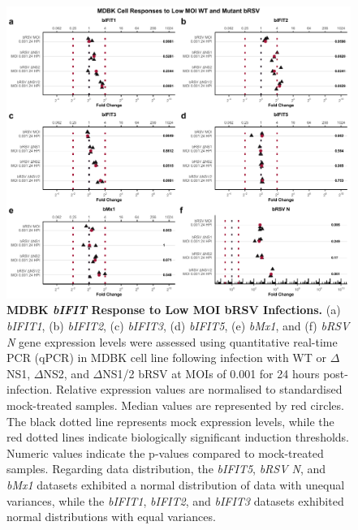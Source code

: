 \begin{figure}
    \centering
    \includegraphics[width=1\linewidth]{07. Chapter 2/Figs/02. Induction/06. mdbk_brsv_low_moi.pdf}
    \caption[MDBK \textit{bIFIT} Response to Low MOI bRSV Infections.]{\textbf{MDBK \textit{bIFIT} Response to Low MOI bRSV Infections.} (a) \textit{bIFIT1}, (b) \textit{bIFIT2}, (c) \textit{bIFIT3}, (d) \textit{bIFIT5}, (e) \textit{bMx1}, and (f) \textit{bRSV N} gene expression levels were assessed using quantitative real-time PCR (qPCR) in MDBK cell line following infection with WT or \(\Delta\)NS1, \(\Delta\)NS2, and \(\Delta\)NS1/2 bRSV at MOIs of 0.001 for 24 hours post-infection. Relative expression values are normalised to standardised mock-treated samples. Median values are represented by red circles. The black dotted line represents mock expression levels, while the red dotted lines indicate biologically significant induction thresholds. Numeric values indicate the p-values compared to mock-treated samples. Regarding data distribution, the \textit{bIFIT5}, \textit{bRSV N}, and \textit{bMx1} datasets exhibited a normal distribution of data with unequal variances, while the \textit{bIFIT1}, \textit{bIFIT2}, and \textit{bIFIT3} datasets exhibited normal distributions with equal variances.}
    \label{fig:MDBK responses to low MOI mutant bRSV}
\end{figure}

